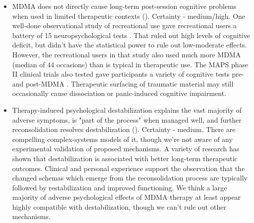 \documentclass[12pt,letterpaper]{book}
\begin{document}
\begin{itemize}
	\item MDMA does not directly cause long-term post-session cognitive problems when used in limited therapeutic contexts (\textcite{wolfgang2025,passieHistory}). Certainty - medium/high. One well-done observational study of recreational use gave recreational users a battery of 15 neuropsychological tests \cite{halpernMormonRavers}. That ruled out high levels of cognitive deficit, but didn't have the statistical power to rule out low-moderate effects. However, the recreational users in that study also used much more MDMA (median of 44 occasions) than is typical in therapeutic use. The MAPS phase II clinical trials also tested gave participants a variety of cognitive tests pre- and post-MDMA \cite{mithoefer2019mdma}. Therapeutic surfacing of traumatic material may still occasionally cause dissociation or panic-induced cognitive impairment.
	\item Therapy-induced psychological destabilization explains the vast majority of adverse symptoms, is "part of the process" when managed well, and further reconsolidation resolves destabilization (\textcite{olthofDestabilization}). Certainty - medium. There are compelling complex-systems models of it, though we're not aware of any experimental validation of proposed mechanisms. A variety of research has shown that destabilization is associated with better long-term therapeutic outcomes. Clinical and personal experience support the observation that the changed schemas which emerge from the reconsolidation process are typically followed by restabilization and improved functioning. We think a large majority of adverse psychological effects of MDMA therapy at least appear highly compatible with destabilization, though we can't rule out other mechanisms.
\end{itemize}
\end{document}
